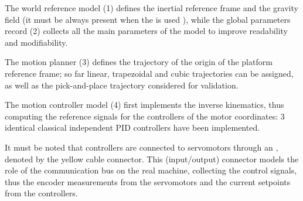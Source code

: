 \documentclass[]{interact}
\theoremstyle{plain}%
\theoremstyle{definition}
\theoremstyle{remark}
\begin{document}
{The world reference model (1) defines the inertial reference frame and the gravity field (it must be always present when the  is used \cite{dlr11987}), while the global parameters record (2) collects all the main parameters of the model to improve readability and modifiability.

The motion planner (3) defines the trajectory of the origin of the platform reference frame; so far linear, trapezoidal and cubic trajectories can be assigned, as well as the pick-and-place trajectory considered for validation.

The motion controller model (4) first implements the inverse kinematics, thus computing the reference signals for the controllers of the motor coordinates: 3 identical classical independent PID controllers have been implemented.

It must be noted that controllers are connected to servomotors through an , denoted by the yellow cable connector. This (input/output) connector models the role of the communication bus on the real machine, collecting the control signals, thus the encoder measurements from the servomotors and the current setpoints from the controllers.

}
\end{document}
